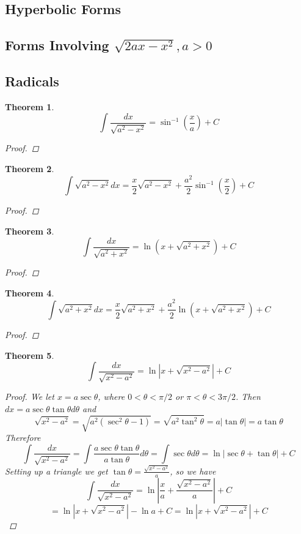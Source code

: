 \documentclass[10pt]{report}
\newtheorem{thm3}{Theorem}[subsection]
\begin{document}
\subsection{Hyperbolic Forms}
\subsection{Forms Involving $\sqrt{2ax - x^2}, a>0$}
\subsection{Radicals}
\begin{thm3}
$$\int \frac{dx}{\sqrt{a^2-x^2}}=\sin^{-1}\left(\frac{x}{a}\right)+C$$
\begin{proof}

\end{proof}
\end{thm3}
\begin{thm3}
$$\int \sqrt{a^2-x^2}dx=\frac{x}{2}\sqrt{a^2-x^2}+\frac{a^2}{2}\sin^{-1}\left(\frac{x}{2}\right)+C$$
\begin{proof}

\end{proof}
\end{thm3}
\begin{thm3}
$$\int \frac{dx}{\sqrt{a^2+x^2}}=\ln(x+\sqrt{a^2+x^2})+C$$
\begin{proof}

\end{proof}
\end{thm3}
\begin{thm3}
$$\int \sqrt{a^2+x^2}dx=\frac{x}{2}\sqrt{a^2+x^2}+\frac{a^2}{2}\ln(x+\sqrt{a^2+x^2})+C$$
\begin{proof}

\end{proof}
\end{thm3}
\begin{thm3}
$$\int \frac{dx}{\sqrt{x^2-a^2}}=\ln \left| x+\sqrt{x^2-a^2} \right|+C$$
\begin{proof}
We let $x=a\sec\theta$, where $0 < \theta < \pi/2$ or $\pi < \theta < 3\pi/2$. Then $dx=a\sec\theta\tan\theta d\theta$ and
$$\sqrt{x^2-a^2} = \sqrt{a^2(\sec^2 \theta -1)}=\sqrt{a^2\tan^2\theta} = a|\tan\theta| = a\tan\theta$$
Therefore
$$\int \frac{dx}{\sqrt{x^2-a^2}} = \int \frac{a\sec\theta\tan\theta}{a\tan\theta}d\theta = \int \sec \theta d\theta = \ln |\sec\theta + \tan \theta|+C$$
Setting up a triangle we get $\tan \theta = \frac{\sqrt{x^2-a^2}}{a}$, so we have
$$\int\frac{dx}{\sqrt{x^2-a^2}} = \ln \left| \frac{x}{a} + \frac{\sqrt{x^2-a^2}}{a}\right| + C$$
$$=\ln|x + \sqrt{x^2-a^2}| - \ln a + C = \ln|x + \sqrt{x^2-a^2}| + C$$
\end{proof}
\end{thm3}
\end{document}
